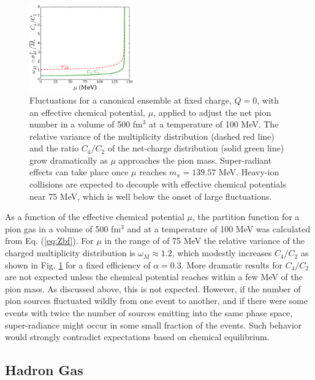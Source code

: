 \begin{figure}
\centerline{\includegraphics[width=0.4\textwidth]{figs/C4_bose}}
\caption{\label{fig:cheapbose}
Fluctuations for a canonical ensemble at fixed charge, $Q=0$, with an effective chemical potential, $\mu$, applied to adjust the net pion number in a volume of 500 fm$^3$ at a temperature of 100 MeV. The relative variance of the multiplicity distribution (dashed red line) and the ratio $C_4/C_2$ of the net-charge distribution (solid green line) grow dramatically as $\mu$ approaches the pion mass. Super-radiant effects can take place once $\mu$ reaches $m_\pi=139.57$ MeV. Heavy-ion collisions are expected to decouple with effective chemical potentials near 75 MeV, which is well below the onset of large fluctuations.
}
\end{figure}
As a function of the effective chemical potential $\mu$, the partition function for a pion gas in a volume of 500 fm$^3$ and at a temperature of 100 MeV was calculated from Eq. (\ref{eq:Zbf}). For $\mu$ in the range of of 75 MeV the relative variance of the charged multiplicity distribution is $\omega_M\approx 1.2$, which modestly increases $C_4/C_2$ as shown in Fig. \ref{fig:cheapbose} for a fixed efficiency of $\alpha=0.3$. More dramatic results for $C_4/C_2$ are not expected unless the chemical potential reaches within a few MeV of the pion mass. As discussed above, this is not expected. However, if the number of pion sources fluctuated wildly from one event to another, and if there were some events with twice the number of sources emitting into the same phase space, super-radiance might occur in some small fraction of the events. Such behavior would strongly contradict expectations based on chemical equilibrium. 


\subsection{Hadron Gas}\label{sec:hadrongas_cheap}

